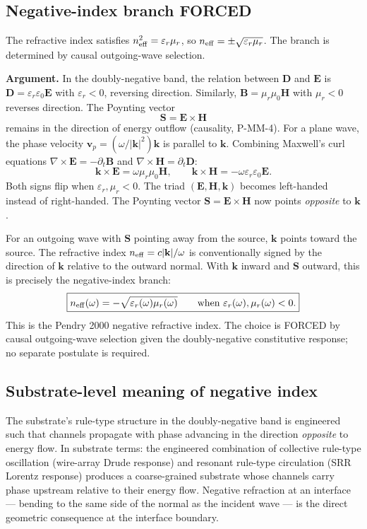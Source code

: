 \documentclass[11pt,a4paper]{article}
\begin{document}
\subsection{Negative-index branch FORCED}

The refractive index satisfies $n_{\rm eff}^2 = \varepsilon_r\mu_r$, so $n_{\rm eff} = \pm\sqrt{\varepsilon_r\mu_r}$. The branch is determined by causal outgoing-wave selection.

\textbf{Argument.} In the doubly-negative band, the relation between $\mathbf{D}$ and $\mathbf{E}$ is $\mathbf{D} = \varepsilon_r\varepsilon_0\mathbf{E}$ with $\varepsilon_r < 0$, reversing direction. Similarly, $\mathbf{B} = \mu_r\mu_0\mathbf{H}$ with $\mu_r < 0$ reverses direction. The Poynting vector
\[
\mathbf{S} = \mathbf{E}\times\mathbf{H}
\]
remains in the direction of energy outflow (causality, P-MM-4). For a plane wave, the phase velocity $\mathbf{v}_p = (\omega/|\mathbf{k}|^2)\mathbf{k}$ is parallel to $\mathbf{k}$. Combining Maxwell's curl equations $\nabla\times\mathbf{E} = -\partial_t\mathbf{B}$ and $\nabla\times\mathbf{H} = \partial_t\mathbf{D}$:
\[
\mathbf{k}\times\mathbf{E} = \omega\mu_r\mu_0\mathbf{H}, \qquad \mathbf{k}\times\mathbf{H} = -\omega\varepsilon_r\varepsilon_0\mathbf{E}.
\]
Both signs flip when $\varepsilon_r, \mu_r < 0$. The triad $(\mathbf{E}, \mathbf{H}, \mathbf{k})$ becomes left-handed instead of right-handed. The Poynting vector $\mathbf{S} = \mathbf{E}\times\mathbf{H}$ now points \emph{opposite} to $\mathbf{k}$.

For an outgoing wave with $\mathbf{S}$ pointing away from the source, $\mathbf{k}$ points toward the source. The refractive index $n_{\rm eff} = c|\mathbf{k}|/\omega$ is conventionally signed by the direction of $\mathbf{k}$ relative to the outward normal. With $\mathbf{k}$ inward and $\mathbf{S}$ outward, this is precisely the negative-index branch:
\[
\boxed{n_{\rm eff}(\omega) = -\sqrt{\varepsilon_r(\omega)\mu_r(\omega)} \qquad \text{when } \varepsilon_r(\omega), \mu_r(\omega) < 0.}
\]
This is the Pendry 2000 negative refractive index. The choice is FORCED by causal outgoing-wave selection given the doubly-negative constitutive response; no separate postulate is required.

\subsection{Substrate-level meaning of negative index}

The substrate's rule-type structure in the doubly-negative band is engineered such that channels propagate with phase advancing in the direction \emph{opposite} to energy flow. In substrate terms: the engineered combination of collective rule-type oscillation (wire-array Drude response) and resonant rule-type circulation (SRR Lorentz response) produces a coarse-grained substrate whose channels carry phase upstream relative to their energy flow. Negative refraction at an interface --- bending to the same side of the normal as the incident wave --- is the direct geometric consequence at the interface boundary.
\end{document}
